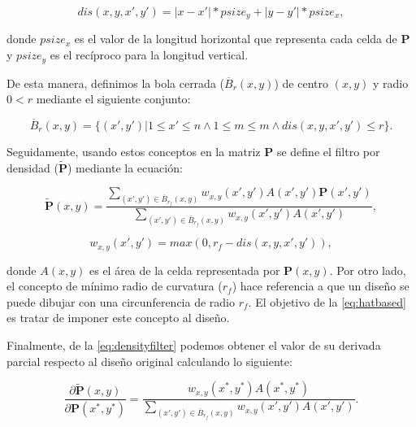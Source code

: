 \begin{equation}
  dis(x, y, x', y') = |x-x'|*psize_y+|y-y'|*psize_x,
  \label{eq:distance}
\end{equation}

\noindent donde $psize_x$ es el valor de la longitud horizontal que representa cada celda de $\boldsymbol{P}$
y $psize_y$ es el recíproco para la longitud vertical.

De esta manera, definimos la bola cerrada ($\overline{B}_{r}(x, y)$)  de centro $(x, y)$ y 
radio $0 < r$ mediante el siguiente conjunto:

\begin{equation}
  \overline{B}_{r}(x, y) = \{(x', y') | 1 \leq x' \leq n \land 1 \leq m \leq m \land 
  dis(x, y, x', y') \leq r\}.
  \label{eq:bola}
\end{equation}

Seguidamente, usando estos conceptos en la matriz $\boldsymbol{P}$
se define el filtro por densidad ($\widetilde{\boldsymbol{P}}$) mediante la ecuación:

\begin{equation}
  \widetilde{\boldsymbol{P}}(x, y) = \frac{\displaystyle\sum_{(x', y') \in \overline{B}_{r_f}(x, y)} w_{x, y}(x', y')
  A(x', y')\boldsymbol{P}(x', y')}
  {\displaystyle\sum_{(x', y') \in \overline{B}_{r_f}(x, y)} w_{x, y}(x', y') A(x', y')},
  \label{eq:densityfilter}
\end{equation}

\begin{equation}
  w_{x, y}(x', y') = max(0, r_f - dis(x, y, x', y')),
  \label{eq:hatbased}
\end{equation}

\noindent donde $A(x, y)$ es el área de la celda representada por $\boldsymbol{P}(x, y)$. 
Por otro lado, el concepto de mínimo radio de curvatura ($r_f$) hace referencia a que un diseño
se puede dibujar con una circunferencia de radio $r_f$.
El objetivo de la \autoref{eq:hatbased} es tratar de imponer este concepto al diseño.

Finalmente, de la \autoref{eq:densityfilter} podemos obtener el valor de su derivada parcial respecto al diseño
original calculando lo siguiente:

\begin{equation}
  \frac{\partial\widetilde{\boldsymbol{P}}(x, y)}{\partial \boldsymbol{P}(x^{*}, y^{*})} = \frac{w_{x, y}(x^{*},
  y^{*})A(x^{*}, y^{*})}
  {\displaystyle\sum_{(x', y') \in \overline{B}_{r_f}(x, y)} w_{x, y}(x', y') A(x', y')}.
  \label{eq:densityfiltergrad}
\end{equation}


